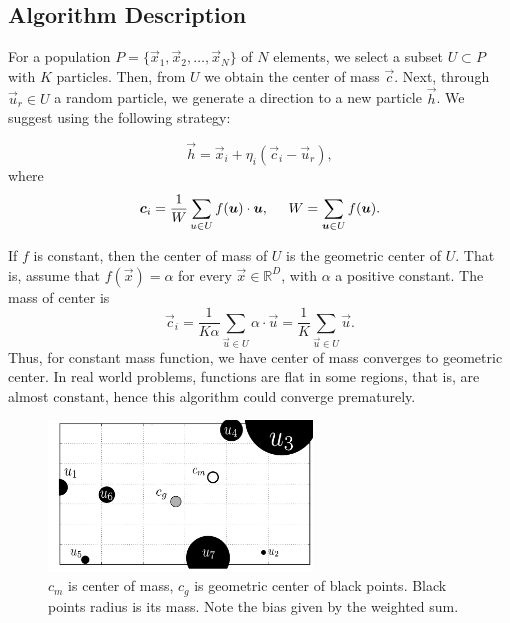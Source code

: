 \documentclass[graybox]{svmult}
\begin{document}
\subsection{Algorithm Description} %
\label{sub:algorithm_description}

For a population $P = \{ \vec{x}_1, \vec{x}_2, \ldots, \vec{x}_{N} \} $ of $N$ elements, we select a subset $U \subset P $ with $K$ particles. Then, from $U$ we obtain the center of mass $\vec{c}$. Next, through $\vec{u}_r \in U$ a random particle,  we generate a direction to a new particle $ \vec{h}$. We suggest using the following strategy:

\begin{equation}
	\vec{h} = \vec{x}_i + \eta _{i} ( \vec{c}_i - \vec{u}_{r} ),
	\label{eqn:vcu}
\end{equation}
%
where 
%
\begin{equation}
	\vec{c}_i = \dfrac{1} {W} \sum_{u \in U} f(\vec{u}) \cdot \vec{u} , 
			\hspace{0.5cm} 
			W = \sum_{ \vec{u} \in U} f(\vec{u}).
	\label{eqn:center}
\end{equation}

\begin{note}
	If $f$ is constant, then the center of mass of $U$ is the geometric center of $U$. That is, assume that $f(\vec{x}) = \alpha$ for every $\vec{x} \in \mathbb{R}^D$, with $\alpha$ a positive constant. The mass of center is
%
\begin{equation}
	\vec{c}_i = \dfrac{1} {K \alpha} \sum_{ \vec{u} \in U} \alpha \cdot \vec{u} =  \dfrac{1} {K } \sum_{\vec{u} \in U} \vec{u}.
	\label{eqn:center-geometric}
\end{equation}
%
Thus, for constant mass function, we have center of mass converges to geometric center. In real world problems, functions are flat in some regions, that is, are almost constant, hence this algorithm could converge prematurely.
\end{note}

\begin{figure}[!ht]
	\sidecaption
	\includegraphics[width=7cm]{img/masses.pdf}
	\caption{$c_m$ is center of mass, $c_g$ is geometric center of black points. Black points radius is its mass. Note the bias given by the weighted sum.}
	\label{fig:masses}       %
\end{figure}
\end{document}

